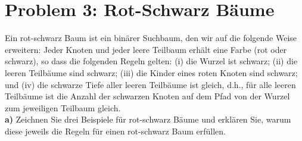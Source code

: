\section*{Problem 3: Rot-Schwarz Bäume} 

Ein rot-schwarz Baum ist ein binärer Suchbaum, den wir auf die folgende Weise erweitern: Jeder Knoten und jeder leere Teilbaum erhält eine Farbe (rot oder schwarz), so dass die folgenden Regeln gelten: (i) die Wurzel ist schwarz; (ii) die leeren Teilbäume sind schwarz; (iii) die Kinder eines roten Knoten sind schwarz; und (iv) die schwarze Tiefe aller leeren Teilbäume ist gleich, d.h., für alle leeren Teilbäume ist die Anzahl der schwarzen Knoten auf dem Pfad von der Wurzel zum jeweiligen Teilbaum gleich.\\

\noindent
\textbf{a)} Zeichnen Sie drei Beispiele für rot-schwarz Bäume und erklären Sie, warum diese jeweils die Regeln für einen rot-schwarz Baum erfüllen. 

